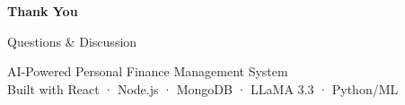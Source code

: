 \documentclass[aspectratio=169, 11pt]{beamer}
\begin{document}
\begin{frame}
  \begin{center}
    \vspace{20pt}
    {\Huge \textcolor{auraviolet}{\textbf{Thank You}}}

    \vspace{20pt}
    {\large Questions \& Discussion}

    \vspace{30pt}

    \vspace{15pt}
    \small\textcolor{auradark}{
      AI-Powered Personal Finance Management System \\
      Built with React · Node.js · MongoDB · LLaMA 3.3 · Python/ML
    }
  \end{center}
\end{frame}
\end{document}

